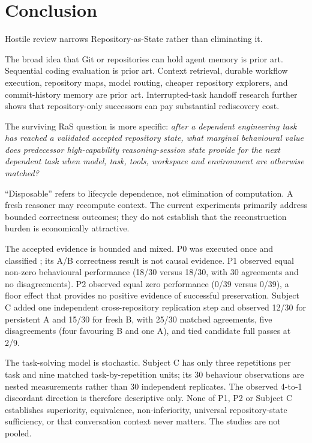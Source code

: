 \section{Conclusion}
\label{sec:conclusion}

Hostile review narrows Repository-as-State rather than eliminating it.

The broad idea that Git or repositories can hold agent memory is prior art. Sequential coding evaluation is prior art. Context retrieval, durable workflow execution, repository maps, model routing, cheaper repository explorers, and commit-history memory are prior art. Interrupted-task handoff research further shows that repository-only successors can pay substantial rediscovery cost.

The surviving RaS question is more specific: \emph{after a dependent engineering task has reached a validated accepted repository state, what marginal behavioural value does predecessor high-capability reasoning-session state provide for the next dependent task when model, task, tools, workspace and environment are otherwise matched?}

“Disposable” refers to lifecycle dependence, not elimination of computation. A fresh reasoner may recompute context. The current experiments primarily address bounded correctness outcomes; they do not establish that the reconstruction burden is economically attractive.

The accepted evidence is bounded and mixed. P0 was executed once and classified \mixedstatus; its A/B correctness result is not causal evidence. P1 observed equal non-zero behavioural performance (18/30 versus 18/30, with 30 agreements and no disagreements). P2 observed equal zero performance (0/39 versus 0/39), a floor effect that provides no positive evidence of successful preservation. Subject C added one independent cross-repository replication step and observed 12/30 for persistent A and 15/30 for fresh B, with 25/30 matched agreements, five disagreements (four favouring B and one A), and tied candidate full passes at 2/9.

The task-solving model is stochastic. Subject C has only three repetitions per task and nine matched task-by-repetition units; its 30 behaviour observations are nested measurements rather than 30 independent replicates. The observed 4-to-1 discordant direction is therefore descriptive only. None of P1, P2 or Subject C establishes superiority, equivalence, non-inferiority, universal repository-state sufficiency, or that conversation context never matters. The studies are not pooled.

